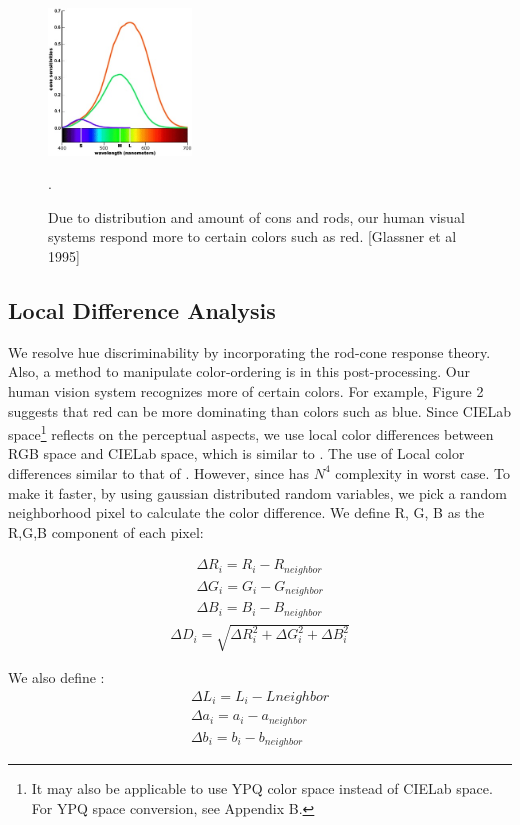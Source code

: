 \documentclass{article}
\begin{document}
\begin{figure}[h]
\centering
 \includegraphics[width=1.5in]{rodconecolors.jpg}
\caption{Due to distribution and amount of cons and rods, our human visual systems respond more to certain colors such as red. [Glassner et al 1995]}.

\label{fig:rodconeresponses}
\end{figure}

\subsection{Local Difference Analysis}
 We resolve hue discriminability by incorporating the rod-cone response theory.  Also, a method to manipulate color-ordering is in this post-processing. Our human vision system recognizes more of certain colors. For example, Figure 2 suggests that red can be more dominating than colors such as blue. Since CIELab space\footnote{It may also be applicable to use YPQ color space instead of CIELab space. For YPQ space conversion, see Appendix B.} reflects on the perceptual aspects, we use local color differences between RGB space and CIELab space, which is similar to \cite{journals/pr/GrundlandD07}. The use of Local color differences similar to that of \cite{Gooch05color2gray:salience-preserving}. However, since \cite{Gooch05color2gray:salience-preserving} has $N^4$ complexity in worst case. To make it faster, by using gaussian distributed random variables, we pick a random neighborhood pixel to calculate the color difference. We define R, G, B as the R,G,B component of each pixel:

\begin{eqnarray}
\Delta R_i=R_i-R_{neighbor} \\
\Delta G_i=G_i-G_{neighbor} \\
\Delta B_i=B_i-B_{neighbor}
\end{eqnarray}
\begin{eqnarray}
\Delta D_i = \sqrt{ \Delta R_i^2 + \Delta G_i^2 + \Delta B_i^2 }
\end{eqnarray}

We also define :
\begin{eqnarray}
\Delta L_i=L_i-L{neighbor} \\
\Delta a_i=a_i-a_{neighbor} \\
\Delta b_i=b_i-b_{neighbor}
\end{eqnarray}
\end{document}
